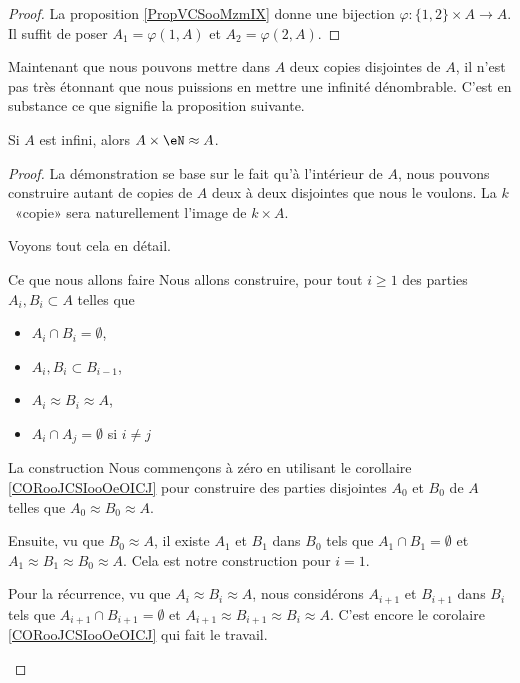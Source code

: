 \begin{proof}
    La proposition \ref{PropVCSooMzmIX} donne une bijection \( \varphi\colon \{ 1,2 \}\times A\to A\). Il suffit de poser \( A_1=\varphi(1,A)\) et \( A_2=\varphi(2,A)\).
\end{proof}

Maintenant que nous pouvons mettre dans \( A\) deux copies disjointes de \( A\), il n'est pas très étonnant que nous puissions en mettre une infinité dénombrable. C'est en substance ce que signifie la proposition suivante.
\begin{proposition} \label{PROPooFKBEooKXqujV}
    Si \( A\) est infini, alors \( A\times \eN\approx A\).
\end{proposition}

\begin{proof}
    La démonstration se base sur le fait qu'à l'intérieur de \( A\), nous pouvons construire autant de copies de \( A\) deux à deux disjointes que nous le voulons. La \( k\)\ieme\ «copie» sera naturellement l'image de \( k\times A\).

    Voyons tout cela en détail.
    \begin{subproof}
        \item[Ce que nous allons faire]
            Nous allons construire, pour tout \( i\geq 1 \) des parties \( A_i,B_i\subset A\) telles que
            \begin{itemize}
                \item \( A_i\cap B_i=\emptyset\),
                \item \( A_i,B_i\subset B_{i-1}\),
                \item \( A_i\approx B_i\approx A\),
                \item \( A_i\cap A_j=\emptyset\) si \( i\neq j\)
            \end{itemize}
        \item[La construction]
            Nous commençons à zéro en utilisant le corollaire \ref{CORooJCSIooOeOICJ} pour construire des parties disjointes \( A_0\) et \( B_0\) de \( A\) telles que \( A_0\approx B_0\approx A\).

            Ensuite, vu que \( B_0\approx A\), il existe \( A_1\) et \( B_1\) dans \( B_0\) tels que \(  A_1\cap B_1=\emptyset\) et \( A_1\approx B_1\approx B_0\approx A\). Cela est notre construction pour \( i=1\).

            Pour la récurrence, vu que \( A_i\approx B_i\approx A\), nous considérons \( A_{i+1}\) et \( B_{i+1}\) dans \( B_i\) tels que \( A_{i+1}\cap B_{i+1}=\emptyset\) et \( A_{i+1}\approx B_{i+1}\approx B_i\approx A\). C'est encore le corolaire \ref{CORooJCSIooOeOICJ} qui fait le travail.


\end{subproof}
\end{proof}

